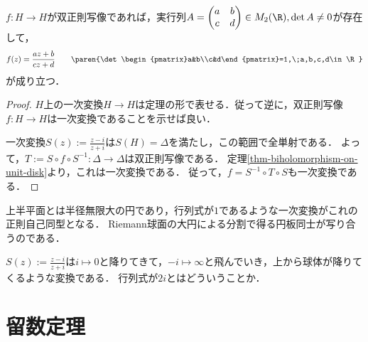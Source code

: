 \documentclass[uplatex, dvipdfmx]{jsreport}
\begin{document}
\begin{theorem}[上半空間の自己同型]
    $f:H\to H$が双正則写像であれば，実行列$A=\begin{pmatrix}a&b\\c&d\end{pmatrix}\in M_2(\R),\det A\ne 0$が存在して，
    \[f(z)=\frac{az+b}{cz+d}\qquad\paren{\det\begin{pmatrix}a&b\\c&d\end{pmatrix}=1,\;a,b,c,d\in\R}\]
    が成り立つ．
\end{theorem}
\begin{proof}
    $H$上の一次変換$H\to H$は定理の形で表せる．従って逆に，双正則写像$f:H\to H$は一次変換であることを示せば良い．

    一次変換$S(z):=\frac{z-i}{z+i}$は$S(H)=\Delta$を満たし，この範囲で全単射である．
    よって，$T:=S\circ f\circ S^{-1}:\Delta\to\Delta$は双正則写像である．
    定理\ref{thm-biholomorphism-on-unit-disk}より，これは一次変換である．
    従って，$f=S^{-1}\circ T\circ S$も一次変換である．
\end{proof}
\begin{remarks}
    上半平面とは半径無限大の円であり，行列式が$1$であるような一次変換がこれの正則自己同型となる．
    Riemann球面の大円による分割で得る円板同士が写り合うのである．

    $S(z):=\frac{z-i}{z+i}$は$i\mapsto 0$と降りてきて，$-i\mapsto\infty$と飛んでいき，上から球体が降りてくるような変換である．
    行列式が$2i$とはどういうことか．
\end{remarks}

\chapter{留数定理}
\end{document}
